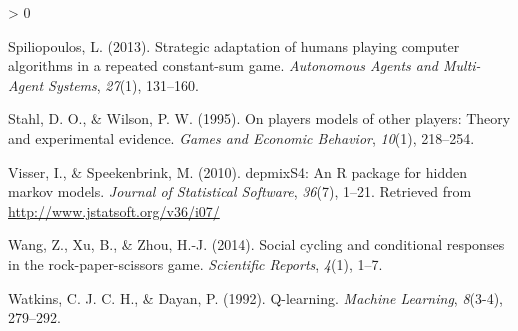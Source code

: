 \documentclass[
  english,
  man,floatsintext]{apa6}
\newlength{\cslhangindent}
\newenvironment{CSLReferences}[2] %
 {%
  \setlength{\parindent}{0pt}
  \ifodd #1 \everypar{\setlength{\hangindent}{\cslhangindent}}\ignorespaces\fi
  \ifnum #2 > 0
  \setlength{\parskip}{#2\baselineskip}
  \fi
 }%
 {}
\begin{document}
\begin{CSLReferences}{1}{0}
\leavevmode\hypertarget{ref-spiliopoulos2013strategic}{}%
Spiliopoulos, L. (2013). {Strategic adaptation of humans playing computer algorithms in a repeated constant-sum game}. \emph{Autonomous Agents and Multi-Agent Systems}, \emph{27}(1), 131--160.

\leavevmode\hypertarget{ref-stahl1995players}{}%
Stahl, D. O., \& Wilson, P. W. (1995). {On players models of other players: Theory and experimental evidence}. \emph{Games and Economic Behavior}, \emph{10}(1), 218--254.

\leavevmode\hypertarget{ref-R-depmixS4}{}%
Visser, I., \& Speekenbrink, M. (2010). {depmixS4}: An {R} package for hidden markov models. \emph{Journal of Statistical Software}, \emph{36}(7), 1--21. Retrieved from \url{http://www.jstatsoft.org/v36/i07/}

\leavevmode\hypertarget{ref-wang2014social}{}%
Wang, Z., Xu, B., \& Zhou, H.-J. (2014). Social cycling and conditional responses in the rock-paper-scissors game. \emph{Scientific Reports}, \emph{4}(1), 1--7.

\leavevmode\hypertarget{ref-watkins1992q}{}%
Watkins, C. J. C. H., \& Dayan, P. (1992). {Q-learning}. \emph{Machine Learning}, \emph{8}(3-4), 279--292.

\end{CSLReferences}

\endgroup
\end{document}
